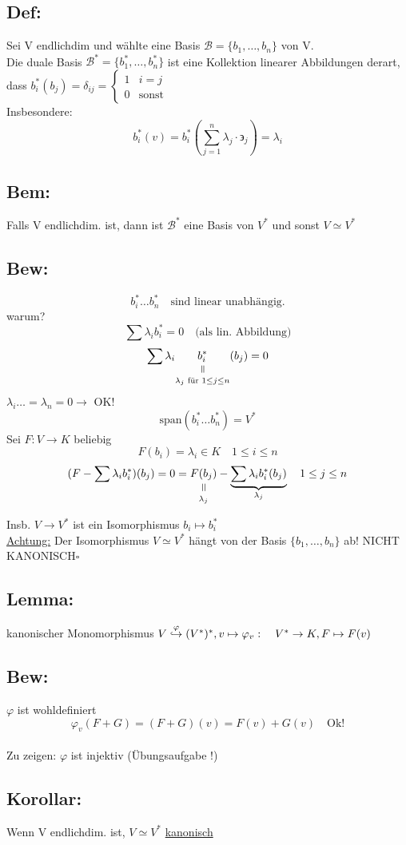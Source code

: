 \documentclass[titlepage,12pt,a4paper,ngerman]{report}
\newenvironment{bew}{\subsection{Bew:}}{\hfill$\square$}
\newcommand{\Bew}[1]{\begin{bew}#1\end{bew}}
\newcommand{\verteq}{\rotatebox{90}{$\,=$}}
\newcommand{\equalto}[2]{\underset{\scriptstyle\overset{\mkern4mu\verteq}{#2}}{#1}}
\newcommand{\tx}[1]{\textrm{#1}}
\newcommand{\casess}[4]{\left\{ \begin{array}{ll} {#1} & {#2} \\ {#3} & {#4} \end{array} \right.}
\begin{document}
\subsection{Def:} Sei V endlichdim und wählte eine Basis $ \mathcal{B} = \{ b_1,\dots,b_n\} $ von  V.\\
Die duale Basis $ \mathcal{B}^* = \{b_1^*,\dots,b_n^*\} $ ist eine Kollektion linearer Abbildungen derart, dass $ b^*_i (b_j) = \delta_{ij} = \casess{1}{i=j}{0}{\tx{sonst}} $\\
Insbesondere:
$$b^*_i(v) = b_i^* (\sum_{j=1}^{n} \lambda_j \cdot \backepsilon_j) = \lambda_i$$
\subsection*{Bem:} Falls V endlichdim. ist, dann ist $ \mathcal{B}^*  $ eine Basis von $ V^* $ und sonst $ V\simeq V^* $

\Bew{
	$$b_i^* \dots b_n^* \quad \tx{sind linear unabhängig.}$$
	warum? $$\sum \lambda_i b_i^* = 0 \quad \tx{(als lin. Abbildung)}$$
	$$\sum \lambda_i \equalto{b_i^*}{\lambda_j \tx{ für } 1 \leq j \leq n}  (b_j) =0$$ 
	$\lambda_i \dots = \lambda_n = 0 \rightarrow$ OK!
	$$\tx{span}(b_i^* \dots b_n^*) = V^*$$
	Sei $F: V \to K$ beliebig 
	$$F(b_i) = \lambda_i \in K \quad 1 \leq i \leq n$$
	$$(F- \sum \lambda_i b_i^*) ( b_j) = 0 = \equalto{F(b_j)}{\lambda_j} - \underbrace{\sum \lambda_i b_i^* (b_j)}_{\lambda_j} \quad 1 \leq j \leq n$$
	
	Insb. $ V\to V^* $ ist ein Isomorphismus $  b_i \mapsto b_i^* $\\
	\underline{Achtung:} Der Isomorphismus $ V\simeq V^* $ hängt von der Basis $ \{b_1,\dots,b_n\} $ ab! NICHT KANONISCH}
\subsection{Lemma:} 
kanonischer Monomorphismus $ V \buildrel \varphi \over \hookrightarrow (V^*)^* , v \mapsto \varphi_v:\quad V^* \to K , F \mapsto F(v)$ 
\subsection{Bew:} $ \varphi $ ist wohldefiniert 
$$ \varphi_v(F+G) = (F+G) (v) = F(v)+ G(v) \quad \tx{Ok!}$$\\
Zu zeigen: $ \varphi $ ist injektiv (Übungsaufgabe !)
\subsection{Korollar:} Wenn V endlichdim. ist, $ V \simeq V^* $ \underline{kanonisch}
\end{document}
